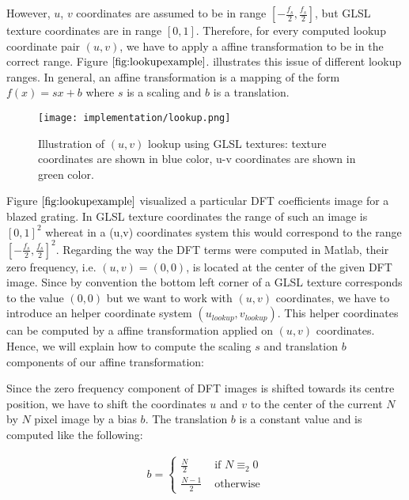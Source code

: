 However, $u$, $v$ coordinates are assumed to be in range $[-\frac{f_s}{2}, \frac{f_s}{2}]$, but GLSL texture coordinates are in range $[0,1]$. Therefore, for every computed lookup coordinate pair $(u,v)$, we have to apply a affine transformation to be in the correct range. Figure $\ref{fig:lookupexample}$.  illustrates this issue of different lookup ranges. In general, an affine transformation is a mapping of the form $f(x) = sx + b$ where $s$ is a scaling and $b$ is a translation.

\begin{figure}[H]
  \centering
  \texttt{[image: implementation/lookup.png]}
  \caption[Lookup DFT Coefficients in Textures]{Illustration of $(u,v)$ lookup using GLSL textures: texture coordinates are shown in blue color, u-v coordinates are shown in green color.}
\label{fig:lookupexample}
\end{figure}

Figure $\ref{fig:lookupexample}$ visualized a particular DFT coefficients image for a blazed grating. In GLSL texture coordinates the range of such an image is $[0,1]^2$ whereat in a (u,v) coordinates system this would correspond to the range $[-\frac{f_s}{2}, \frac{f_s}{2}]^2$. Regarding the way the DFT terms were computed in Matlab, their zero frequency, i.e. $(u,v) = (0,0)$, is located at the center of the given DFT image. Since by convention the bottom left corner of a GLSL texture corresponds to the value $(0,0)$ but we want to work with $(u,v)$ coordinates, we have to introduce an helper coordinate system $(u_{lookup}, v_{lookup})$. This helper coordinates can be computed by a affine transformation applied on $(u,v)$ coordinates. Hence, we will explain how to compute the scaling $s$ and translation $b$ components of our affine transformation: 

Since the zero frequency component of DFT images is shifted towards its centre position, we have to shift the coordinates $u$ and $v$ to the center of the current $N$ by $N$ pixel image by a bias $b$. The translation $b$ is a constant value and is computed like the following:

\begin{align}
b = \left\{ \begin{array}{rl}
\frac{N}{2} &\mbox{ if $N \equiv_2 0$} \\
\frac{N-1}{2} &\mbox{ otherwise}
\end{array} \right.
\label{eq:bias}
\end{align}

